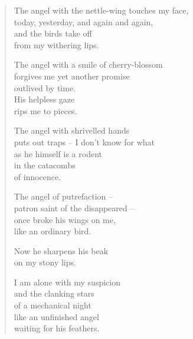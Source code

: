 \begin{verse}
The angel with the nettle-wing touches my face,\\
today, yesterday, and again and again,\\
and the birds take off\\
from my withering lips.

The angel with a smile of cherry-blossom\\
forgives me yet another promise\\
outlived by time.\\
His helpless gaze\\
rips me to pieces.

The angel with shrivelled hands\\
puts out traps -- I don't know for what\\
as he himself is a rodent\\
in the catacombs\\
of innocence.

The angel of putrefaction --\\
patron saint of the disappeared --\\
once broke his wings on me,\\
like an ordinary bird.

Now he sharpens his beak\\
on my stony lips.

\clearpage

I am alone with my suspicion\\
and the clanking stars\\
of a mechanical night\\
like an unfinished angel\\
waiting for his feathers.
\end{verse}

\let\PoemTitlefont=\oldpoemfont

